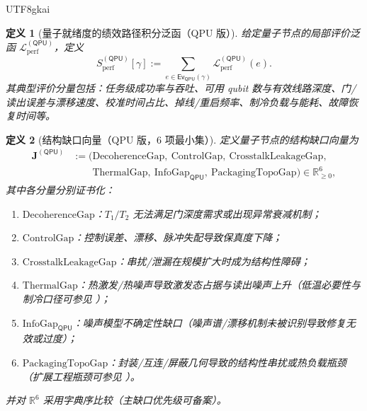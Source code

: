 \documentclass[12pt]{article}
\newtheorem{definition}{定义}[section]
\newcommand{\RR}{\mathbb{R}}
\begin{document}
\begin{CJK*}{UTF8}{gkai}
\begin{definition}[量子就绪度的绩效路径积分泛函（QPU 版）]
\label{def:qpu-performance-functional}
给定量子节点的局部评价泛函 $\mathcal{L}_{\mathrm{perf}}^{(\mathsf{QPU})}$，定义
\[
  S_{\mathrm{perf}}^{(\mathsf{QPU})}[\gamma]
  :=
  \sum_{e\in \mathsf{Ev}_{\mathsf{QPU}}(\gamma)} \mathcal{L}_{\mathrm{perf}}^{(\mathsf{QPU})}(e).
\]
其典型评价分量包括：任务级成功率与吞吐、可用 qubit 数与有效线路深度、门/读出误差与漂移速度、校准时间占比、掉线/重启频率、制冷负载与能耗、故障恢复时间等。
\end{definition}

\begin{definition}[结构缺口向量（QPU 版，6 项最小集）]
\label{def:qpu-gap-vector}
定义量子节点的结构缺口向量为
\[
  \begin{aligned}
    \mathbf{J}^{(\mathsf{QPU})}
    &:=
    \bigl(
      \mathrm{DecoherenceGap},\ \mathrm{ControlGap},\ \mathrm{CrosstalkLeakageGap},\\
      &\qquad\mathrm{ThermalGap},\ \mathrm{InfoGap}_{\mathsf{QPU}},\ \mathrm{PackagingTopoGap}
    \bigr)\in\RR_{\ge 0}^6,
  \end{aligned}
\]
其中各分量分别证书化：
\begin{enumerate}
  \item $\mathrm{DecoherenceGap}$：$T_1/T_2$ 无法满足门深度需求或出现异常衰减机制；
  \item $\mathrm{ControlGap}$：控制误差、漂移、脉冲失配导致保真度下降；
  \item $\mathrm{CrosstalkLeakageGap}$：串扰/泄漏在规模扩大时成为结构性障碍；
  \item $\mathrm{ThermalGap}$：热激发/热噪声导致激发态占据与读出噪声上升（低温必要性与制冷口径可参见 \cite{ref_nationalacademies_25196_ch13}）；
  \item $\mathrm{InfoGap}_{\mathsf{QPU}}$：噪声模型不确定性缺口（噪声谱/漂移机制未被识别导致修复无效或过度）；
  \item $\mathrm{PackagingTopoGap}$：封装/互连/屏蔽几何导致的结构性串扰或热负载瓶颈（扩展工程瓶颈可参见 \cite{ref_springer_epjqt_2019_0072_0}）。
\end{enumerate}
并对 $\RR^6$ 采用字典序比较（主缺口优先级可备案）。
\end{definition}


\end{CJK*}
\end{document}
